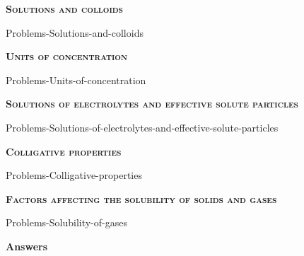 \documentclass[main.tex]{subfiles}
\newcommand\chapterlabel{Ch-solutions}
\begin{document}
\newpage
\fancyhfoffset[E,O]{0pt}
\setlength{\columnsep}{30pt}
\begin{conclusion}
\end{conclusion}
\begin{multicols*}{2}\setcounter{numA}{1}

{\raggedright\textsc{\textbf{Solutions and colloids }}\par}
{Problems-Solutions-and-colloids}
{\raggedright\textsc{\textbf{Units of concentration }}\par}
{Problems-Units-of-concentration}
{\raggedright\textsc{\textbf{Solutions of electrolytes and effective solute particles }}\par}
{Problems-Solutions-of-electrolytes-and-effective-solute-particles}
{\raggedright\textsc{\textbf{Colligative properties }}\par}
{Problems-Colligative-properties}
{\raggedright\textsc{\textbf{Factors affecting the solubility of solids and gases }}\par}
{Problems-Solubility-of-gases}






\end{multicols*}

\newpage
\begin{answersenvironment}
\begin{minipage}[c]{1\textwidth}
\begin{localsize}{10}
{\Large \bf Answers}
  \printsolutions[byID={1,3,5,7,9,11,13,15,17,19,21,23,25,27,29,31,33}]
\end{localsize}
\end{minipage}\end{answersenvironment}
 \clearpage\thispagestyle{empty}\mbox{}
\end{document}

